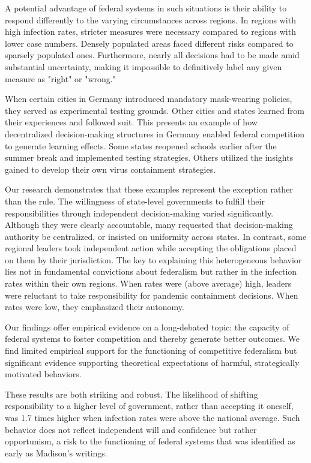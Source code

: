 \documentclass[12pt, abstract=true]{scrartcl}
\begin{document}
A potential advantage of federal systems in such situations is their ability to respond differently to the varying circumstances across regions. In regions with high infection rates, stricter measures were necessary compared to regions with lower case numbers. Densely populated areas faced different risks compared to sparsely populated ones. Furthermore, nearly all decisions had to be made amid substantial uncertainty, making it impossible to definitively label any given measure as "right" or "wrong."

When certain cities in Germany introduced mandatory mask-wearing policies, they served as experimental testing grounds. Other cities and states learned from their experiences and followed suit. This presents an example of how decentralized decision-making structures in Germany enabled federal competition to generate learning effects. Some states reopened schools earlier after the summer break and implemented testing strategies. Others utilized the insights gained to develop their own virus containment strategies.

Our research demonstrates that these examples represent the exception rather than the rule. The willingness of state-level governments to fulfill their responsibilities through independent decision-making varied significantly. Although they were clearly accountable, many requested that decision-making authority be centralized, or insisted on uniformity across states. In contrast, some regional leaders took independent action while accepting the obligations placed on them by their jurisdiction. The key to explaining this heterogeneous behavior lies not in fundamental convictions about federalism but rather in the infection rates within their own regions. When rates were (above average) high, leaders were reluctant to take responsibility for pandemic containment decisions. When rates were low, they emphasized their autonomy.

Our findings offer empirical evidence on a long-debated topic: the capacity of federal systems to foster competition and thereby generate better outcomes. We find limited empirical support for the functioning of competitive federalism but significant evidence supporting theoretical expectations of harmful, strategically motivated behaviors.

These results are both striking and robust. The likelihood of shifting responsibility to a higher level of government, rather than accepting it oneself, was 1.7 times higher when infection rates were above the national average. Such behavior does not reflect independent will and confidence but rather opportunism, a risk to the functioning of federal systems that was identified as early as Madison's writings.
\end{document}
